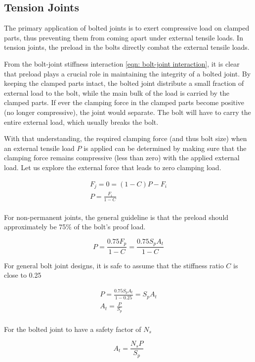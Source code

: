\documentclass[a4paper,openany,12pt]{book}
\begin{document}
{{\subsection{Tension Joints}
\label{tension-joints}
The primary application of bolted joints is to exert compressive load on
clamped parts, thus preventing them from coming apart under external
tensile loads. In tension joints, the preload in the bolts directly
combat the external tensile loads.

From the bolt-joint stiffness interaction
\ref{eqn: bolt-joint interaction}, it is
clear that preload plays a crucial role in maintaining the integrity of
a bolted joint. By keeping the clamped parts intact, the bolted joint
distribute a small fraction of external load to the bolt, while the main
bulk of the load is carried by the clamped parts. If ever the clamping
force in the clamped parts become positive (no longer compressive), the
joint would separate. The bolt will have to carry the entire external
load, which usually breaks the bolt.

With that understanding, the required clamping force (and thus bolt
size) when an external tensile load \(P\) is applied can be determined by
making sure that the clamping force remains compressive (less than zero)
with the applied external load. Let us explore the external force that
leads to zero clamping load.

$$\begin{gathered}
  F_j = 0 = (1 - C)P - F_i \\ 
  P = \frac{F_i}{1 - C} \\ 
\end{gathered}$$

For non-permanent joints, the general guideline is that the preload
should approximately be 75\% of the bolt's proof load.

$$P = \frac{0.75F_p}{1 - C} = \frac{0.75S_pA_t}{1 - C}$$

For general bolt joint designs, it is safe to assume that the stiffness
ratio \(C\) is close to 0.25

$$\begin{gathered}
  P = \frac{0.75S_pA_t}{1 - 0.25} = S_pA_t \\ 
  A_t = \frac{P}{S_p} \\ 
\end{gathered}$$

For the bolted joint to have a safety factor of \(N_s\)

$$\label{eqn: tension joint bolt sizing}
  A_t = \frac{N_sP}{S_p}$$

}}
\end{document}
